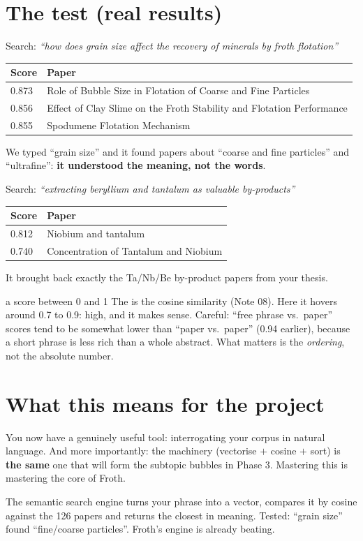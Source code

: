 \documentclass[11pt,a4paper]{article}
\begin{document}
\section{The test (real results)}

Search: \emph{``how does grain size affect the recovery of minerals by froth flotation''}
\begin{center}
\begin{tabular}{ll}
\textbf{Score} & \textbf{Paper} \\
\hline
0.873 & Role of Bubble Size in Flotation of Coarse and Fine Particles \\
0.856 & Effect of Clay Slime on the Froth Stability and Flotation Performance \\
0.855 & Spodumene Flotation Mechanism \\
\end{tabular}
\end{center}
We typed ``grain size'' and it found papers about ``coarse and fine particles'' and
``ultrafine'': \textbf{it understood the meaning, not the words}.

Search: \emph{``extracting beryllium and tantalum as valuable by-products''}
\begin{center}
\begin{tabular}{ll}
\textbf{Score} & \textbf{Paper} \\
\hline
0.812 & Niobium and tantalum \\
0.740 & Concentration of Tantalum and Niobium \\
\end{tabular}
\end{center}
It brought back exactly the Ta/Nb/Be by-product papers from your thesis.

\begin{concepto}{a score between 0 and 1}
The  is the cosine similarity (Note 08). Here it hovers around 0.7 to 0.9:
high, and it makes sense. Careful: ``free phrase vs.\ paper'' scores tend to be somewhat
lower than ``paper vs.\ paper'' (0.94 earlier), because a short phrase is less rich than a
whole abstract. What matters is the \emph{ordering}, not the absolute number.
\end{concepto}

\section{What this means for the project}

You now have a genuinely useful tool: interrogating your corpus in natural language. And more
importantly: the machinery (vectorise $+$ cosine $+$ sort) is \textbf{the same} one that will
form the subtopic bubbles in Phase 3. Mastering this is mastering the core of Froth.

\begin{resumen}
The semantic search engine turns your phrase into a vector, compares it by cosine against the
126 papers and returns the closest in meaning. Tested: ``grain size'' found ``fine/coarse
particles''. Froth's engine is already beating.
\end{resumen}
\end{document}
